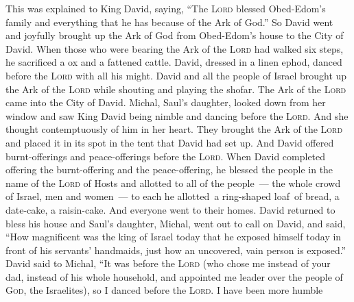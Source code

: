 \begin{inparaenum}
   This was explained to King David, saying, ``The \textsc{Lord} blessed Obed-Edom's family and everything that he has because of the Ark of God.'' So David went and joyfully brought up the Ark of God from Obed-Edom's house to the City of David.%
   When those who were bearing the Ark of the \textsc{Lord} had walked six steps, he sacrificed a ox and a fattened cattle.%
   David, dressed in a linen ephod, danced before the \textsc{Lord} with all his might.%
   David and all the people of Israel brought up the Ark of the \textsc{Lord} while shouting and playing the shofar.%
   The Ark of the \textsc{Lord} came into the City of David. Michal, Saul's daughter, looked down from her window and saw King David being nimble and dancing before the \textsc{Lord}. And she thought contemptuously of him in her heart.%
   They brought the Ark of the \textsc{Lord} and placed it in its spot in the tent that David had set up. And David offered burnt-offerings and peace-offerings before the \textsc{Lord}.%
   When David completed offering the burnt-offering and the peace-offering, he blessed the people in the name of the \textsc{Lord} of Hosts%
   and allotted to all of the people~--- the whole crowd of Israel, men and women~--- to each he allotted\understood\ a ring-shaped loaf\understood\ of bread, a date-cake, a raisin-cake. And everyone went to their homes.%
   David returned to bless his house and Saul's daughter, Michal, went out to call on David, and said, ``How magnificent was the king of Israel today that he exposed himself today in front of his servants' handmaids, just how an uncovered, vain person is exposed.''%
   David said to Michal, ``It was before the \textsc{Lord} (who chose me instead of your dad, instead of his whole household, and appointed me leader over the people of \textsc{God}, the Israelites), so I danced before the \textsc{Lord}.%
   I have been more humble
\end{inparaenum}
